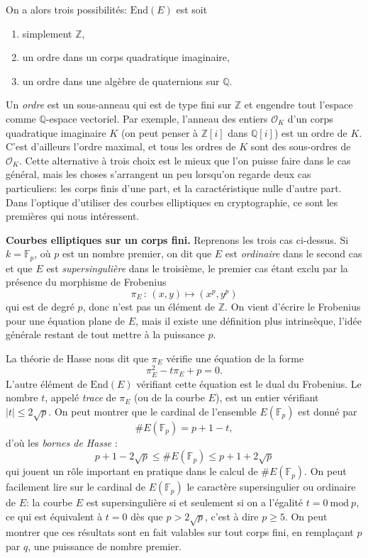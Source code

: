 \documentclass[11pt,a4paper]{article}
\newcommand{\Z}{\mathbb{Z}}
\newcommand{\F}{\mathbb{F}}
\newcommand{\Q}{\mathbb{Q}}
\renewcommand{\O}{\mathcal{O}}
\newcommand{\End}{\mathrm{End}}
\newcommand{\de}{\,:\,}
\renewcommand{\mod}{\ \mathrm{mod}\ }
\renewcommand{\v}{\vspace{5mm}}
\theoremstyle{definition}
\begin{document}
On a alors trois possibilités: $\End(E)$ est soit
\begin{enumerate} 
\item simplement $\Z$, 
\item un ordre dans un corps quadratique imaginaire,
\item un ordre dans une algèbre de quaternions sur $\Q$. 
\end{enumerate}
Un \emph{ordre} est un sous-anneau qui est de type fini sur $\Z$ et engendre tout l'espace comme $\Q$-espace vectoriel. Par exemple, l'anneau des entiers $\O_K$ d'un corps quadratique imaginaire $K$ (on peut penser à $\Z[i]$ dans $\Q[i]$) est un ordre de $K$. C'est d'ailleurs l'ordre maximal, et tous les ordres de $K$ sont des sous-ordres de $\O_K$. Cette alternative à trois choix est le mieux que l'on puisse faire dans le cas général, mais les choses s'arrangent un peu lorsqu'on regarde deux cas particuliers: les corps finis d'une part, et la caractéristique nulle d'autre part. Dans l'optique d'utiliser des courbes elliptiques en cryptographie, ce sont les premières qui nous intéressent.

\v

\textbf{Courbes elliptiques sur un corps fini.} Reprenons les trois cas ci-dessus. Si $k = \F_p$, où $p$ est un nombre premier, on dit que $E$ est \emph{ordinaire} dans le second cas et que $E$ est \emph{supersingulière} dans le troisième, le premier cas étant exclu par la présence du morphisme de Frobenius
$$\pi_E\de (x,y)\mapsto (x^p, y^p)$$
qui est de degré $p$, donc n'est pas un élément de $\Z$. On vient d'écrire le Frobenius pour une équation plane de $E$, mais il existe une définition plus intrinsèque, l'idée générale restant de tout mettre à la puissance $p$.

La théorie de Hasse nous dit que $\pi_E$ vérifie une équation de la forme
$$\pi_E^2 - t \pi_E + p = 0.$$
L'autre élément de $\End(E)$ vérifiant cette équation est le dual du Frobenius.
Le nombre $t$, appelé \emph{trace} de $\pi_E$ (ou de la courbe $E$), est un entier vérifiant $|t|\leq 2\sqrt{p}$. On peut montrer que le cardinal de l'ensemble $E(\F_p)$ est donné par
$$\# E(\F_p) = p + 1 - t,$$
d'où les \emph{bornes de Hasse} :
$$p + 1 - 2\sqrt{p} \leq \#E(\F_p) \leq p + 1 + 2\sqrt{p}$$
qui jouent un rôle important en pratique dans le calcul de $\# E(\F_p)$. On peut facilement lire sur le cardinal de $E(\F_p)$ le caractère supersingulier ou ordinaire de $E$: la courbe $E$ est supersingulière si et seulement si on a l'égalité $t = 0 \mod p$, ce qui est équivalent à $t=0$ dès que $p > 2\sqrt{p}$, c'est à dire $p \geq 5$. On peut montrer que ces résultats sont en fait valables sur tout corps fini, en remplaçant $p$ par $q$, une puissance de nombre premier.
\end{document}
